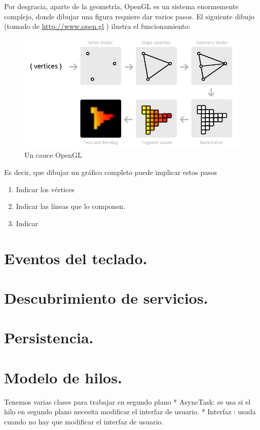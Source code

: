 \documentclass[a4paper,12pt,spanish]{sphinxmanual}
\begin{document}
Por desgracia, aparte de la geometría, OpenGL es un sistema enormemente complejo, donde dibujar una figura requiere dar varios pasos. El siguiente dibujo (tomado de \href{http://Open.gl}{http://www.open.gl} ) ilustra el funcionamiento:
\begin{figure}[htbp]
\centering
\capstart

\includegraphics{cauce.png}
\caption{Un cauce OpenGL}\end{figure}

Es decir, que dibujar un gráfico completo puede implicar estos pasos
\begin{enumerate}
\item {} 
Indicar los vértices

\item {} 
Indicar las líneas que lo componen.

\item {} 
Indicar

\end{enumerate}


\section{Eventos del teclado.}
\label{tema2:eventos-del-teclado}

\section{Descubrimiento de servicios.}
\label{tema2:descubrimiento-de-servicios}

\section{Persistencia.}
\label{tema2:persistencia}

\section{Modelo de hilos.}
\label{tema2:modelo-de-hilos}
Tenemos varias clases para trabajar en segundo plano
* AsyncTask: se usa si el hilo en segundo plano necesita modificar el interfaz de usuario.
* Interfaz : usada cuando no hay que modificar el interfaz de usuario.
\end{document}
